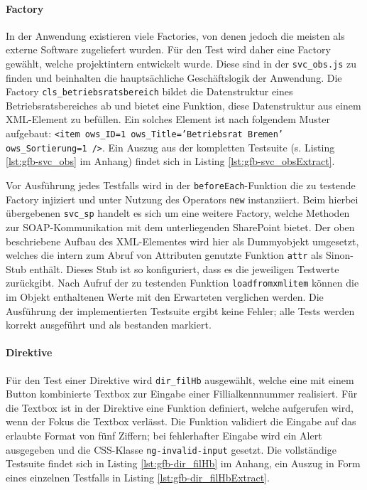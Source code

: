 \paragraph{Factory}
In der Anwendung existieren viele Factories, von denen jedoch die meisten als externe Software zugeliefert wurden. Für den Test wird daher eine Factory gewählt, welche projektintern entwickelt wurde. Diese sind in der \texttt{svc\_obs.js} zu finden und beinhalten die hauptsächliche Geschäftslogik der Anwendung. Die Factory \texttt{cls\_betriebsratsbereich} bildet die Datenstruktur eines Betriebsratsbereiches ab und bietet eine Funktion, diese Datenstruktur aus einem XML-Element zu befüllen. Ein solches Element ist nach folgendem Muster aufgebaut: \texttt{<item ows\_ID=1 ows\_Title='Betriebsrat Bremen' ows\_Sortierung=1 />}. Ein Auszug aus der kompletten Testsuite (s. Listing \ref{lst:gfb-svc_obs} im Anhang) findet sich in Listing \ref{lst:gfb-svc_obsExtract}.


\begin{figure}[H]
	
\end{figure}

Vor Ausführung jedes Testfalls wird in der \texttt{beforeEach}-Funktion die zu testende Factory injiziert und unter Nutzung des Operators \texttt{new} instanziiert. Beim hierbei übergebenen \texttt{svc\_sp} handelt es sich um eine weitere Factory, welche Methoden zur SOAP-Kommunikation mit dem unterliegenden SharePoint bietet. Der oben beschriebene Aufbau des XML-Elementes wird hier als Dummyobjekt umgesetzt, welches die intern zum Abruf von Attributen genutzte Funktion \texttt{attr} als Sinon-Stub enthält. Dieses Stub ist so konfiguriert, dass es die jeweiligen Testwerte zurückgibt. Nach Aufruf der zu testenden Funktion \texttt{loadfromxmlitem} können die im Objekt enthaltenen Werte mit den Erwarteten verglichen werden. Die Ausführung der implementierten Testsuite ergibt keine Fehler; alle Tests werden korrekt ausgeführt und als bestanden markiert.

\paragraph{Direktive}
Für den Test einer Direktive wird \texttt{dir\_filHb} ausgewählt, welche eine mit einem Button kombinierte Textbox zur Eingabe einer Fillialkennnummer realisiert. Für die Textbox ist in der Direktive eine Funktion definiert, welche aufgerufen wird, wenn der Fokus die Textbox verlässt. Die Funktion validiert die Eingabe auf das erlaubte Format von fünf Ziffern; bei fehlerhafter Eingabe wird ein Alert ausgegeben und die CSS-Klasse \texttt{ng-invalid-input} gesetzt. Die vollständige Testsuite findet sich in Listing \ref{lst:gfb-dir_filHb} im Anhang, ein Auszug in Form eines einzelnen Testfalls in Listing \ref{lst:gfb-dir_filHbExtract}.

